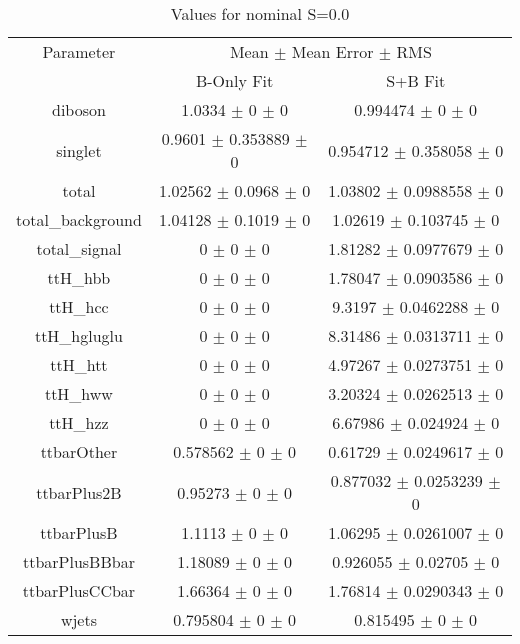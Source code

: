 \begin{table}
\centering
\caption{Values for nominal S=0.0}
\begin{tabular}{ccc}
\toprule
Parameter & \multicolumn{2}{c}{Mean $\pm$ Mean Error $\pm$ RMS}\\
 & B-Only Fit & S+B Fit\\
\midrule
diboson & \num{1.0334} $\pm$ \num{0} $\pm$ \num{0} & \num{0.994474} $\pm$ \num{0} $\pm$ \num{0}\\
singlet & \num{0.9601} $\pm$ \num{0.353889} $\pm$ \num{0} & \num{0.954712} $\pm$ \num{0.358058} $\pm$ \num{0}\\
total & \num{1.02562} $\pm$ \num{0.0968} $\pm$ \num{0} & \num{1.03802} $\pm$ \num{0.0988558} $\pm$ \num{0}\\
total\_background & \num{1.04128} $\pm$ \num{0.1019} $\pm$ \num{0} & \num{1.02619} $\pm$ \num{0.103745} $\pm$ \num{0}\\
total\_signal & \num{0} $\pm$ \num{0} $\pm$ \num{0} & \num{1.81282} $\pm$ \num{0.0977679} $\pm$ \num{0}\\
ttH\_hbb & \num{0} $\pm$ \num{0} $\pm$ \num{0} & \num{1.78047} $\pm$ \num{0.0903586} $\pm$ \num{0}\\
ttH\_hcc & \num{0} $\pm$ \num{0} $\pm$ \num{0} & \num{9.3197} $\pm$ \num{0.0462288} $\pm$ \num{0}\\
ttH\_hgluglu & \num{0} $\pm$ \num{0} $\pm$ \num{0} & \num{8.31486} $\pm$ \num{0.0313711} $\pm$ \num{0}\\
ttH\_htt & \num{0} $\pm$ \num{0} $\pm$ \num{0} & \num{4.97267} $\pm$ \num{0.0273751} $\pm$ \num{0}\\
ttH\_hww & \num{0} $\pm$ \num{0} $\pm$ \num{0} & \num{3.20324} $\pm$ \num{0.0262513} $\pm$ \num{0}\\
ttH\_hzz & \num{0} $\pm$ \num{0} $\pm$ \num{0} & \num{6.67986} $\pm$ \num{0.024924} $\pm$ \num{0}\\
ttbarOther & \num{0.578562} $\pm$ \num{0} $\pm$ \num{0} & \num{0.61729} $\pm$ \num{0.0249617} $\pm$ \num{0}\\
ttbarPlus2B & \num{0.95273} $\pm$ \num{0} $\pm$ \num{0} & \num{0.877032} $\pm$ \num{0.0253239} $\pm$ \num{0}\\
ttbarPlusB & \num{1.1113} $\pm$ \num{0} $\pm$ \num{0} & \num{1.06295} $\pm$ \num{0.0261007} $\pm$ \num{0}\\
ttbarPlusBBbar & \num{1.18089} $\pm$ \num{0} $\pm$ \num{0} & \num{0.926055} $\pm$ \num{0.02705} $\pm$ \num{0}\\
ttbarPlusCCbar & \num{1.66364} $\pm$ \num{0} $\pm$ \num{0} & \num{1.76814} $\pm$ \num{0.0290343} $\pm$ \num{0}\\
wjets & \num{0.795804} $\pm$ \num{0} $\pm$ \num{0} & \num{0.815495} $\pm$ \num{0} $\pm$ \num{0}\\
\bottomrule
\end{tabular}
\end{table}